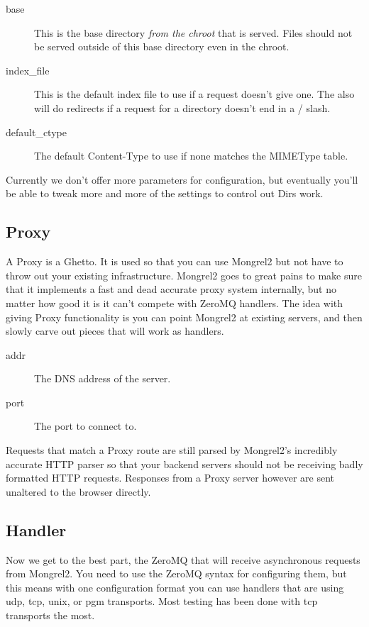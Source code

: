 \begin{description}
\item[base]  This is the base directory \emph{from the chroot} that is served.  Files should not
    be served outside of this base directory even in the chroot.
\item[index\_file] This is the default index file to use if a request doesn't give one.  The 
    also will do redirects if a request for a directory doesn't end in a / slash.
\item[default\_ctype] The default Content-Type to use if none matches the MIMEType table.
\end{description}

Currently we don't offer more parameters for configuration, but eventually you'll be able to tweak more and
more of the settings to control out Dirs work.

\subsection{Proxy}

A Proxy is a Ghetto.  It is used so that you can use Mongrel2 but not have to throw
out your existing infrastructure.  Mongrel2 goes to great pains to make sure that it
implements a fast and dead accurate proxy system internally, but no matter how good it
is it can't compete with ZeroMQ handlers.  The idea with giving Proxy functionality is
you can point Mongrel2 at existing servers, and then slowly carve out pieces that 
will work as handlers.


\begin{description}
\item[addr] The DNS address of the server.
\item[port] The port to connect to.
\end{description}

Requests that match a Proxy route are still parsed by Mongrel2's incredibly accurate
HTTP parser so that your backend servers should not be receiving badly formatted
HTTP requests.  Responses from a Proxy server however are sent unaltered to the
browser directly.


\subsection{Handler}

Now we get to the best part, the ZeroMQ  that will receive asynchronous requests
from Mongrel2.  You need to use the ZeroMQ syntax for configuring them, but this means with one
configuration format you can use handlers that are using udp, tcp, unix, or pgm transports.  Most
testing has been done with tcp transports the most.

